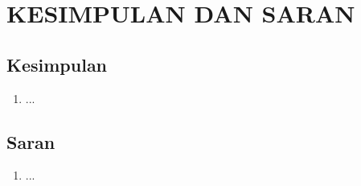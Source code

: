 \chapter{KESIMPULAN DAN SARAN}
\label{bab:kesimpulan}

\section{Kesimpulan}
\begin{enumerate}
  \item ...
\end{enumerate}

\section{Saran}
\begin{enumerate}
  \item ...
\end{enumerate}
